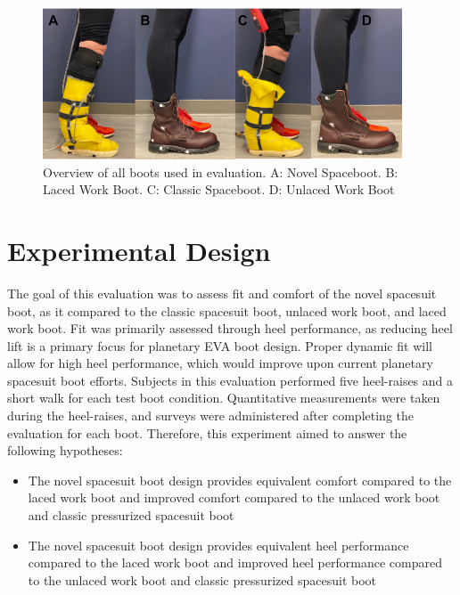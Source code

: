 \documentclass[defaultstyle,11pt]{thesis}
\providecommand{\tightlist}{%
  \setlength{\itemsep}{0pt}\setlength{\parskip}{0pt}}
\begin{document}
\hypertarget{fig:SA4-boots}{%
\begin{figure}
\centering
\includegraphics[width=0.95\textwidth,height=\textheight]{../fig/SA4/allBoots.png}
\caption[{Overview of all boots used in evaluation}]{Overview of all boots used in evaluation. A: Novel Spaceboot. B: Laced Work Boot. C: Classic Spaceboot. D: Unlaced Work Boot}
\label{fig:SA4-boots}
\end{figure}
}

\hypertarget{experimental-design}{%
\section{Experimental Design}\label{experimental-design}}

The goal of this evaluation was to assess fit and comfort of the novel spacesuit boot, as it compared to the classic spacesuit boot, unlaced work boot, and laced work boot.
Fit was primarily assessed through heel performance, as reducing heel lift is a primary focus for planetary EVA boot design.
Proper dynamic fit will allow for high heel performance, which would improve upon current planetary spacesuit boot efforts.
Subjects in this evaluation performed five heel-raises and a short walk for each test boot condition.
Quantitative measurements were taken during the heel-raises, and surveys were administered after completing the evaluation for each boot.
Therefore, this experiment aimed to answer the following hypotheses:

\begin{itemize}
\tightlist
\item
  The novel spacesuit boot design provides equivalent comfort compared to the laced work boot and improved comfort compared to the unlaced work boot and classic pressurized spacesuit boot
\item
  The novel spacesuit boot design provides equivalent heel performance compared to the laced work boot and improved heel performance compared to the unlaced work boot and classic pressurized spacesuit boot
\end{itemize}
\end{document}
